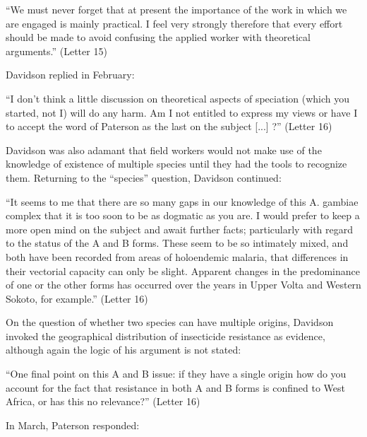 \documentclass[a4paper,11pt,abstracton,hidelinks]{scrartcl}
\begin{document}
\begin{displayquote}
``We must never forget that at present the importance of the work in which we are engaged is mainly practical. I feel very strongly therefore that every effort should be made to avoid confusing the applied worker with theoretical arguments.'' (Letter 15)
\end{displayquote}


Davidson replied in February:

\begin{displayquote}
``I don't think a little discussion on theoretical aspects of speciation (which you started, not I) will do any harm. Am I not entitled to express my views or have I to accept the word of Paterson as the last on the subject [...] ?'' (Letter 16)
\end{displayquote}


Davidson was also adamant that field workers would not make use of the knowledge of existence of multiple species until they had the tools to recognize them. Returning to the ``species'' question, Davidson continued:


\begin{displayquote}
``It seems to me that there are so many gaps in our knowledge of this A. gambiae complex that it is too soon to be as dogmatic as you are. I would prefer to keep a more open mind on the subject and await further facts; particularly with regard to the status of the A and B forms. These seem to be so intimately mixed, and both have been recorded from areas of holoendemic malaria, that differences in their vectorial capacity can only be slight. Apparent changes in the predominance of one or the other forms has occurred over the years in Upper Volta and Western Sokoto, for example.'' (Letter 16)
\end{displayquote}


On the question of whether two species can have multiple origins, Davidson invoked the geographical distribution of insecticide resistance as evidence, although again the logic of his argument is not stated:

\begin{displayquote}
``One final point on this A and B issue: if they have a single origin how do you account for the fact that resistance in both A and B forms is confined to West Africa, or has this no relevance?'' (Letter 16)
\end{displayquote}


In March, Paterson responded:
\end{document}
